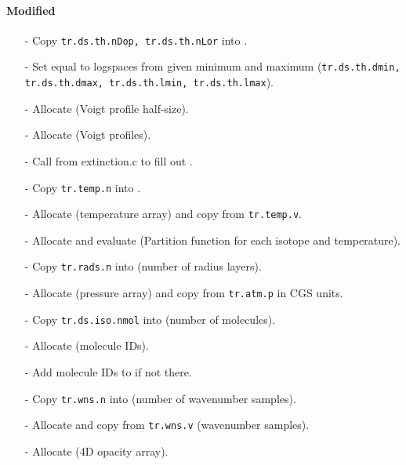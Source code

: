 \documentclass[letterpaper,12pt]{article}
\begin{document}
\paragraph{Modified}
\begin{enumerate}[leftmargin=10pt, noitemsep, parsep=0pt, topsep=0ex]
\item[-] Copy {\tt tr.ds.th.nDop, tr.ds.th.nLor} into .
\item[-] Set  equal to logspaces from given minimum and maximum ({\tt tr.ds.th.dmin, tr.ds.th.dmax, tr.ds.th.lmin, tr.ds.th.lmax}).
\item[-] Allocate  (Voigt profile half-size).
\item[-] Allocate  (Voigt profiles).
\item[-] Call  from extinction.c to fill out .
\item[-] Copy {\tt tr.temp.n} into .
\item[-] Allocate  (temperature array) and copy from {\tt tr.temp.v}.
\item[-] Allocate and evaluate  (Partition function for each isotope and temperature).
\item[-] Copy {\tt tr.rads.n} into  (number of radius layers).
\item[-] Allocate  (pressure array) and copy from {\tt tr.atm.p} in CGS units.
\item[-] Copy {\tt tr.ds.iso.nmol} into  (number of molecules).
\item[-] Allocate  (molecule IDs).
\item[-] Add molecule IDs to  if not there.
\item[-] Copy {\tt tr.wns.n} into  (number of wavenumber samples).
\item[-] Allocate  and copy from {\tt tr.wns.v} (wavenumber samples).
\item[-] Allocate  (4D opacity array).
\end{enumerate}
\end{document}
